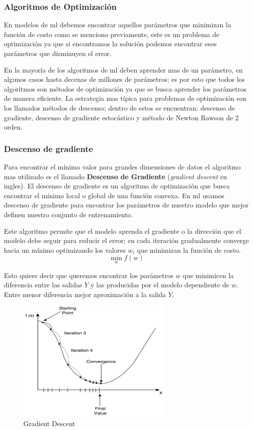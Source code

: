 \subsubsection{Algoritmos de Optimización} 
En modelos de \ac{ml} debemos encontrar aquellos parámetros que minimizan la función de costo como se menciono previamente, este es un problema de optimización ya que si encontramos la solución podemos encontrar esos parámetros que disminuyen el error.

En la mayoría de los algoritmos de \ac{ml} deben aprender mas de un parámetro, en algunos casos hasta decenas de millones de parámetros; es por esto que todos los algoritmos  son métodos de optimización ya que se busca aprender los parámetros de manera eficiente. La estrategia mas típica para problemas de optimización son los llamados métodos de descenso; dentro de estos se encuentran: descenso de gradiente, descenso de gradiente estocástico y método de Newton Rawson de 2 orden.

\subsubsection*{Descenso de gradiente}\label{sub:gradient-desc}
Para encontrar el mínimo valor para grandes dimensiones de datos el algoritmo mas utilizado es el llamado \textbf{Descenso de Gradiente} (\textit{gradient descent} en ingles). El descenso de gradiente es un algoritmo de optimización que busca encontrar el mínimo local o global de una función convexa.  En \ac{ml} usamos descenso de gradiente para encontrar los parámetros de nuestro modelo que mejor definen nuestro conjunto de entrenamiento.

Este algoritmo permite que el modelo aprenda el gradiente o la dirección que el modelo debe seguir para reducir el error; en cada iteración gradualmente converge hacia un mínimo optimizando los valores $w_i $ que minimizan la función de costo. $$\min_{w} f(w)$$

Esto quiere decir que queremos encontrar los parámetros $w$ que minimicen la diferencia entre las salidas $Y$ y las producidas por el modelo dependiente de $w$. Entre menor  diferencia mejor aproximación a la salida $Y$. 

\begin{figure}[H] \centering
  \includegraphics[height=6cm,keepaspectratio=true,clip=true]{imagenes/MarcoTeorico/gradient-descent.png}
  \caption{Gradient Descent }\label{Fig:gradient-descent}
\end{figure}


